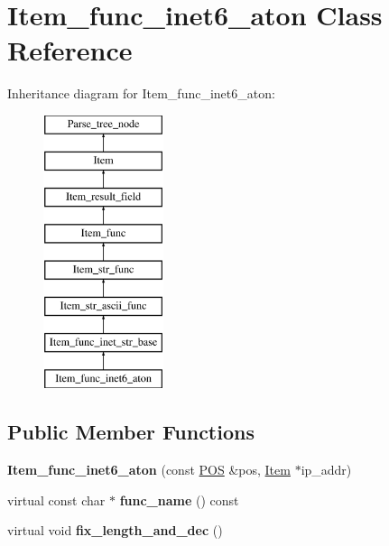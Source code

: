 \hypertarget{classItem__func__inet6__aton}{}\section{Item\+\_\+func\+\_\+inet6\+\_\+aton Class Reference}
\label{classItem__func__inet6__aton}
Inheritance diagram for Item\+\_\+func\+\_\+inet6\+\_\+aton\+:\begin{figure}[H]
\begin{center}
\leavevmode
\includegraphics[height=8.000000cm]{classItem__func__inet6__aton}
\end{center}
\end{figure}
\subsection*{Public Member Functions}
\begin{DoxyCompactItemize}
\item 
\mbox{\label{classItem__func__inet6__aton_a5614f99f5ce7b9277fc483db13938d9c}} 
{\bfseries Item\+\_\+func\+\_\+inet6\+\_\+aton} (const \mbox{\hyperlink{structYYLTYPE}{P\+OS}} \&pos, \mbox{\hyperlink{classItem}{Item}} $\ast$ip\+\_\+addr)
\item 
\mbox{\label{classItem__func__inet6__aton_a2500d99f776fc898c9eaf5fbf6e7935d}} 
virtual const char $\ast$ {\bfseries func\+\_\+name} () const
\item 
\mbox{\label{classItem__func__inet6__aton_a209f85753116d68c5f26f7dc59973e55}} 
virtual void {\bfseries fix\+\_\+length\+\_\+and\+\_\+dec} ()
\end{DoxyCompactItemize}
